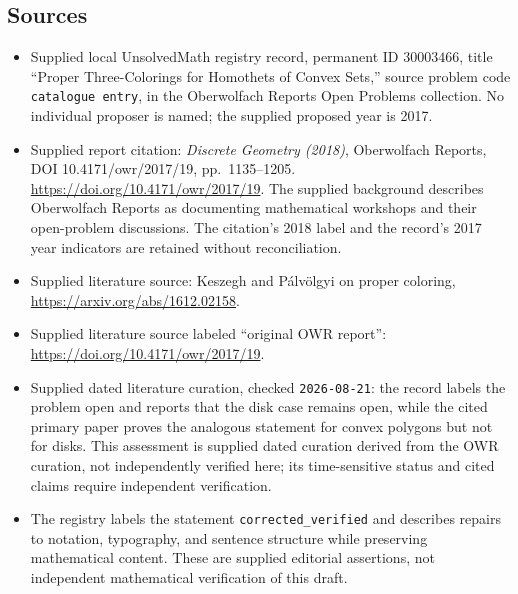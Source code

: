 \documentclass[11pt]{article}
\begin{document}
\subsection{Sources}
\begin{itemize}
\item Supplied local UnsolvedMath registry record, permanent ID \(30003466\), title ``Proper Three-Colorings for Homothets of Convex Sets,'' source problem code \texttt{catalogue entry}, in the Oberwolfach Reports Open Problems collection. No individual proposer is named; the supplied proposed year is 2017.
\item Supplied report citation: \emph{Discrete Geometry (2018)}, Oberwolfach Reports, DOI 10.4171/owr/2017/19, pp.\ 1135--1205. \url{https://doi.org/10.4171/owr/2017/19}. The supplied background describes Oberwolfach Reports as documenting mathematical workshops and their open-problem discussions. The citation's 2018 label and the record's 2017 year indicators are retained without reconciliation.
\item Supplied literature source: Keszegh and P\'alv\"olgyi on proper coloring, \url{https://arxiv.org/abs/1612.02158}.
\item Supplied literature source labeled ``original OWR report'': \url{https://doi.org/10.4171/owr/2017/19}.
\item Supplied dated literature curation, checked \texttt{2026-08-21}: the record labels the problem open and reports that the disk case remains open, while the cited primary paper proves the analogous statement for convex polygons but not for disks. This assessment is supplied dated curation derived from the OWR curation, not independently verified here; its time-sensitive status and cited claims require independent verification.
\item The registry labels the statement \texttt{corrected\_verified} and describes repairs to notation, typography, and sentence structure while preserving mathematical content. These are supplied editorial assertions, not independent mathematical verification of this draft.
\end{itemize}
\end{document}

